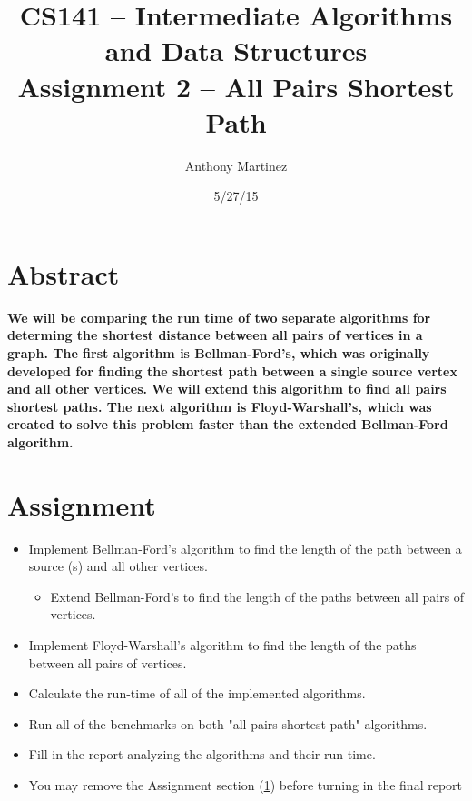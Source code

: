 \documentclass[twocolumn]{article}
\title{CS141 -- Intermediate Algorithms and Data Structures\\Assignment 2 -- All
Pairs Shortest Path}
\author{Anthony Martinez}
\date{5/27/15}
\begin{document}
\maketitle

\section*{Abstract}
\textbf{\small We will be comparing the run time of two separate algorithms for determing the shortest distance between
all pairs of vertices in a graph. The first algorithm is Bellman-Ford's, which was originally developed for
finding the shortest path between a single source vertex and all other vertices. We will extend this algorithm to find
all pairs shortest paths. The next algorithm is Floyd-Warshall's, which was created to solve this problem faster than
the extended Bellman-Ford algorithm.}

\section{Assignment}
\label{sec::assignment}
\begin{itemize}
    \item Implement Bellman-Ford's algorithm to find the length of the path between a source (s) and all other vertices.
    \begin{itemize}
        \item Extend Bellman-Ford's to find the length of the paths between all pairs of vertices.
    \end{itemize}
    \item Implement Floyd-Warshall's algorithm to find the length of the paths between all pairs of vertices.
    \item Calculate the run-time of all of the implemented algorithms.
    \item Run all of the benchmarks on both "all pairs shortest path" algorithms.
    \item Fill in the report analyzing the algorithms and their run-time.
    \item You may remove the Assignment section (\cref{sec::assignment}) before turning in the final report
\end{itemize}
\end{document}
